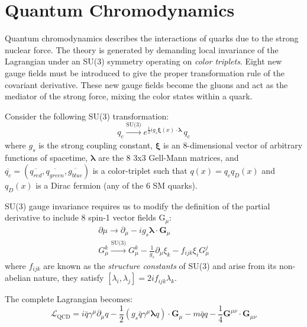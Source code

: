 \section{Quantum Chromodynamics} 

Quantum chromodynamics describes the interactions of quarks due to the strong nuclear force. The theory is generated by demanding local invariance of the Lagrangian under an SU(3) symmetry operating on \textit{color triplets}. Eight new gauge fields must be introduced to give the proper transformation rule of the covariant derivative. These new gauge fields become the gluons and act as the mediator of the strong force, mixing the color states within a quark.

Consider the following SU(3) transformation:
\begin{equation}
q_{c} \xrightarrow[]{\text{SU(3)}} e^{ \frac{1}{2} i g_{s} \bm{\xi}(x) \cdot \bm{\lambda}} \, q_{c}
\end{equation}
where $g_{s}$ is the strong coupling constant, $\bm{\xi}$ is an 8-dimensional vector of arbitrary functions of spacetime, $\bm{\lambda}$ are the 8 3x3 Gell-Mann matrices, and $\overline{q_{c}}=(\overline{q_{red}}, \overline{q_{green}}, \overline{g_{blue}})$ is a color-triplet such that $q(x) = q_{c} q_{D}(x)$ and $q_{D}(x)$ is a Dirac fermion (any of the 6 SM quarks).

SU(3) gauge invariance requires us to modify the definition of the partial derivative to include 8 spin-1 vector fields $\bm{\mathrm{G}}_{\mu}$:
\begin{equation}
\begin{array}{l}
\partial{\mu} \rightarrow \partial_{\mu} - i g_{s} \bm{\lambda} \cdot \bm{G}_{\mu}\\
G^{k}_{\mu} \xrightarrow[]{\text{SU(3)}} G^{k}_{\mu} - \frac{1}{g_{s}}\partial_{\mu}\xi_{k} - f_{ijk}\xi_{i}G^{j}_{\mu}
\end{array}
\end{equation}
where $f_{ijk}$ are known as the \textit{structure constants} of SU(3) and arise from its non-abelian nature, they satisfy $[\lambda_{i},\lambda_{j}] = 2if_{ijk}\lambda_{k}$.

The complete Lagrangian becomes:
\begin{equation}
\mathcal{L}_{\mathrm{QCD}} =
i \bar{q} \gamma^{\mu} \partial_{\mu} q
-  \frac{1}{2} (g_{s} \bar{q} \gamma^{\mu} \bm{\lambda} q) \cdot \textbf{G}_{\mu}
- m \bar{q} q
- \frac{1}{4} \textbf{G}^{\mu\nu} \cdot \textbf{G}_{\mu\nu}
\end{equation}

